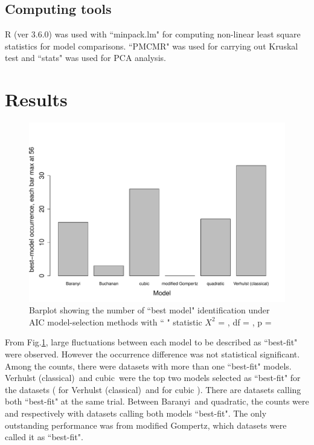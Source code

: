 \documentclass[a4paper, 11pt]{article}
\newcommand{\fve}{Verhulst (classical)}
\newcommand{\fgo}{modified Gompertz}
\newcommand{\fba}{Baranyi}
\newcommand{\fqu}{quadratic}
\newcommand{\fcu}{cubic}
\begin{document}
	\subsection*{Computing tools}
	R (ver 3.6.0)\autocite{Rcore} was used with ``minpack.lm"\autocite{minpacklm} for computing non-linear least square statistics for model comparisons. ``PMCMR"\autocite{PMCMR} was used for carrying out Kruskal test and ``stats"\autocite{Rcore} was used for PCA analysis.
	
	\section*{Results}
	\begin{figure}[h]
		\centering
		\includegraphics[width=.8\linewidth]{../results/barplot_BestModel.pdf}
		\caption{Barplot showing the number of ``best model" identification under AIC model-selection methods with ``
			" statistic $X^{2}$ = 
			, df = 
			, p = 
		}\label{barPT}
	\end{figure}
	From Fig.\ref{barPT}, large fluctuations between each model to be described as ``best-fit" were observed.  However the occurrence difference was not statistical significant.  Among the counts, there were 
	datasets with more than one ``best-fit" models.  \fve\ and \fcu\ were the top two models selected as ``best-fit" for the 
	 datasets (
	  for \fve\ and 
	  for \fcu
	 ).  There are 
	  datasets calling both ``best-fit" at the same trial.  Between \fba\ and \fqu, the counts were 
	  and 
	  respectively with 
	 datasets calling both models ``best-fit".  The only outstanding performance was from \fgo, which 
	  datasets were called it as ``best-fit".\\
	  
\end{document}
